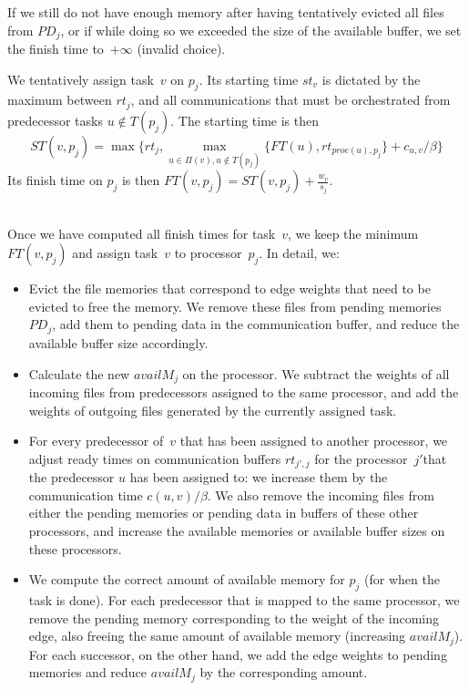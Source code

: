 \documentclass[conference]{IEEEtran}
\newcommand{\PD}{PD}
\begin{document}
    If we still do not have enough memory after having tentatively evicted all files from $\PD_j$,
    or if while doing so we exceeded the size of the available buffer,
    we set the finish time to~$+\infty$ (invalid choice).

    \smallskip
     We tentatively assign task~$v$ on $p_j$.
    Its starting time $st_v$ is dictated by the maximum between $rt_j$, and all communications that
    must be orchestrated from predecessor tasks $u\notin T(p_j)$.
    The starting time is then
    \[ST(v, p_j) = \max{ \{rt_j, \max_{ u \in \Pi(v), u\notin T(p_j)}\{ FT(u) , rt_{proc(u), p_j}\} + c_{u,v} / \beta \} } \]
    Its finish time on $p_j$ is then
    $FT(v,p_j) = ST(v, p_j) + \frac{w_v}{s_j}$.



    \medskip
    \\
    Once we have computed all finish times for task~$v$,
    we keep the minimum $FT(v,p_j)$ and assign task~$v$
    to processor~$p_j$.
    In detail, we:
    \begin{itemize}
        \item  Evict the file memories that correspond to edge weights that need to be evicted to free the memory.
        We remove these files from pending memories
        $PD_j$, add them to pending data in the communication buffer, and reduce the available buffer size accordingly.
        \item    Calculate the new $availM_j$ on the processor.
        We subtract the weights of all incoming files from predecessors assigned to the same processor,
        and add the weights of outgoing files generated by the currently assigned task.
        \item  For every predecessor of~$v$ that has been assigned to another processor, we adjust ready times on
        communication buffers $rt_{j', j}$ for the processor~$j'$that the predecessor $u$ has been assigned to: we increase them by the
        communication time $c( u,v) / \beta$.
        We also remove the incoming files from either the pending memories or pending data in buffers of these other
        processors, and increase the available memories or available buffer sizes on these processors.
        \item We compute the correct amount of available memory for $p_j$ (for when the task is done).
        For each predecessor that is mapped to the same processor, we remove the pending memory corresponding to the weight of
        the incoming edge, also freeing the same amount of available memory (increasing $availM_j$).
        For each successor, on the other hand, we add the edge weights to pending memories and reduce $availM_j$ by the corresponding
        amount.
    \end{itemize}
\end{document}
